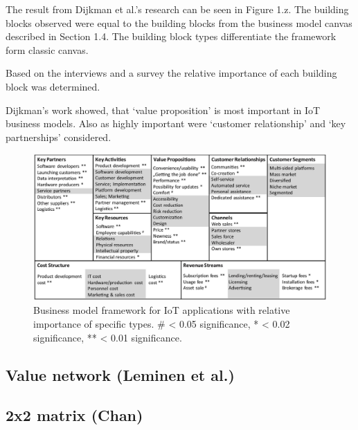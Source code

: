 		The result from Dijkman et al.'s research can be seen in Figure 1.z. The building blocks observed were equal to the building blocks from the business model canvas described in Section 1.4. The building block types differentiate the framework form classic canvas.

		Based on the interviews and a survey the relative importance of each building block was determined. 

		Dijkman's work showed, that `value proposition' is most important in IoT business models. Also as highly important were `customer relationship' and `key  partnerships' considered. 
		\begin{figure}[h]
			\begin{center}
		    \includegraphics[scale=0.52]{Talk11/iot_canvas_rel_imp_dijkman.jpg}
		    \end{center}
		    \caption{Business model framework for IoT applications with relative importance of specific types. \# < 0.05 significance, * < 0.02 significance, **  < 0.01 significance.}
		    \label{Business model for IoT}
		\end{figure}

		\subsection{Value network (Leminen et al.)}

		\subsection{2x2 matrix (Chan)}



